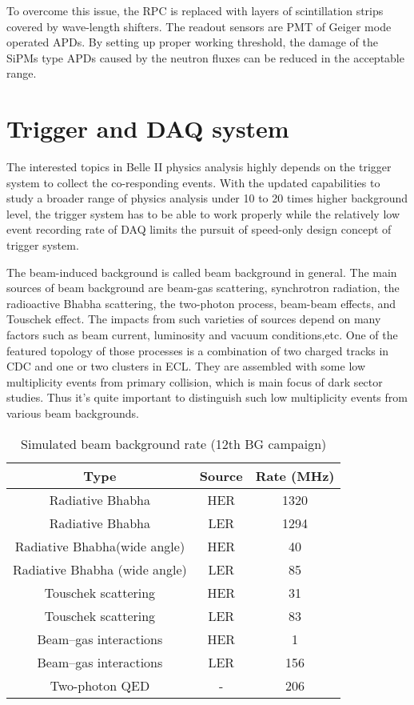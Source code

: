 To overcome this issue, the RPC is replaced with layers of scintillation strips covered by wave-length shifters. The readout sensors are PMT of Geiger mode
operated APDs. By setting up proper working threshold, the damage of the SiPMs type APDs caused by the neutron fluxes can be reduced in the acceptable range. 


\section{Trigger and DAQ system}
The interested topics in Belle II physics analysis highly depends on the trigger system to collect the co-responding events. With the updated capabilities to  study a broader range of physics analysis under 10 to 20 times higher background level, the trigger system has to be able to work properly while the relatively low event recording rate of DAQ limits the pursuit of speed-only design concept of trigger system. 

The beam-induced background is called beam background in general. The main sources of beam background are beam-gas scattering, synchrotron radiation, the radioactive Bhabha scattering, the two-photon process, beam-beam effects, and Touschek effect. The impacts from such varieties of sources depend on many factors such as beam current, luminosity and vacuum conditions,etc. One of the featured topology of those processes is a combination of two charged tracks in CDC and one or two clusters in ECL. They are assembled with some low multiplicity events from primary collision, which is main focus of dark sector studies. Thus it's quite important to distinguish such low multiplicity events from various beam backgrounds.



\begin{table}[htbp]
	\centering
	\large
	\caption{Simulated beam background rate (12th BG campaign)\cite{b2book}}
	\begin{tabular}{c c c}
		\toprule
		Type & Source & Rate (MHz)\\
		\hline
		Radiative Bhabha & HER &  1320\\
		Radiative Bhabha & LER &  1294\\
		Radiative Bhabha(wide angle) & HER &  40\\
		Radiative Bhabha (wide angle) & LER &  85\\
		Touschek scattering & HER &  31\\
		Touschek scattering & LER &  83\\
		Beam–gas interactions & HER &  1\\
		Beam–gas interactions & LER &  156\\
		Two-photon QED & - & 206\\
		\bottomrule
	\end{tabular}
\end{table}

